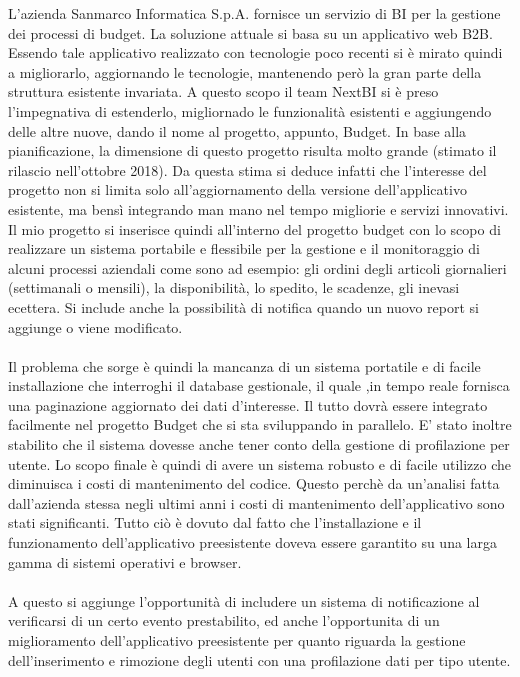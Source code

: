 L'azienda Sanmarco Informatica S.p.A. fornisce un servizio di BI per la gestione dei processi di budget. La soluzione attuale si basa su un applicativo web B2B. Essendo tale applicativo realizzato con tecnologie poco recenti si è mirato quindi a migliorarlo, aggiornando le tecnologie, mantenendo però la gran parte della struttura esistente invariata.  A questo scopo il team NextBI si è preso l'impegnativa di estenderlo, migliornado le funzionalità esistenti e aggiungendo delle altre nuove, dando il nome al progetto, appunto, Budget. In base alla pianificazione, la dimensione di questo progetto risulta molto grande (stimato il rilascio nell'ottobre 2018). Da questa stima si deduce infatti che l'interesse del progetto non si limita solo all'aggiornamento della versione dell'applicativo esistente, ma bensì integrando man mano nel tempo migliorie e servizi innovativi. Il mio progetto si inserisce quindi all'interno del progetto budget con lo scopo di realizzare un sistema portabile e flessibile per la gestione e il monitoraggio di alcuni processi aziendali come sono ad esempio: gli ordini degli articoli giornalieri (settimanali o mensili), la disponibilità, lo spedito, le scadenze, gli inevasi ecettera. Si include anche la possibilità di notifica quando un nuovo report si aggiunge o viene modificato. 
\\ \\
Il problema che sorge è quindi la mancanza di un sistema portatile e di facile installazione che interroghi il database gestionale, il quale ,in tempo reale fornisca una paginazione aggiornato dei dati d'interesse. Il tutto dovrà essere integrato facilmente nel progetto Budget che si sta sviluppando in parallelo. E' stato inoltre stabilito che il sistema dovesse anche tener conto della gestione di profilazione per utente. Lo scopo finale è quindi di avere un sistema robusto e di facile utilizzo che diminuisca i costi di mantenimento del codice. Questo perchè da un'analisi fatta dall'azienda stessa negli ultimi anni i costi di mantenimento dell'applicativo sono  stati significanti. Tutto ciò è dovuto dal fatto che l'installazione e il funzionamento dell'applicativo preesistente doveva essere garantito su una larga gamma di sistemi operativi e browser.
\\ \\
A questo si aggiunge l'opportunità di includere un sistema di notificazione al verificarsi di un certo evento prestabilito, ed anche l'opportunita di un miglioramento dell'applicativo preesistente per quanto riguarda  la gestione dell'inserimento e rimozione degli utenti con una profilazione dati per tipo utente.





